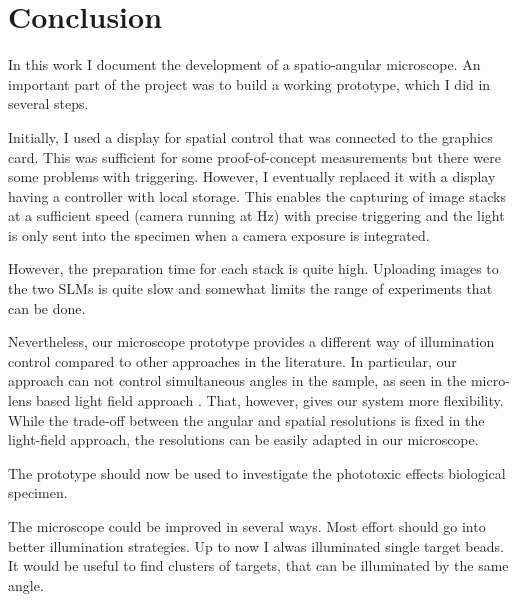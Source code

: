 \chapter{Conclusion}
In this work I document the development of a spatio-angular
microscope. An important part of the project was to build a working
prototype, which I did in several steps.

Initially, I used a display for spatial control that was connected to
the graphics card. This was sufficient for some proof-of-concept
measurements but there were some problems with triggering. However, I
eventually replaced it with a display having a controller with local
storage. This enables the capturing of image stacks at a sufficient
speed (camera running at \unit[30]{Hz}) with precise triggering and
the light is only sent into the specimen when a camera exposure is
integrated.

However, the preparation time for each stack is quite high.  Uploading
images to the two SLMs is quite slow and somewhat limits the range of
experiments that can be done.

Nevertheless, our microscope prototype provides a different way of
illumination control compared to other approaches in the
literature. In particular, our approach can not control simultaneous
angles in the sample, as seen in the micro-lens based light field
approach \citep{Levoy2009}. That, however, gives our system more
flexibility. While the trade-off between the angular and spatial
resolutions is fixed in the light-field approach, the resolutions can
be easily adapted in our microscope.

The prototype should now be used to investigate the phototoxic effects
biological specimen.

The microscope could be improved in several ways.  Most effort should
go into better illumination strategies. Up to now I alwas illuminated
single target beads. It would be useful to find clusters of targets,
that can be illuminated by the same angle.


